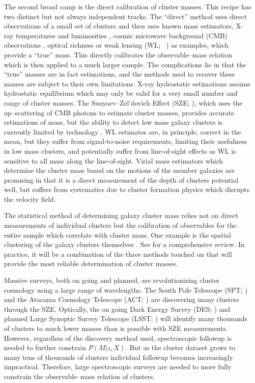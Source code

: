 \documentclass[fleqn,usenatbib]{mnras}
\begin{document}
The second broad camp is the direct calibration of cluster masses. This recipe has two distinct but not always independent tracks. The ``direct'' method uses direct observations of a small set of clusters and then uses known mass estimators, X-ray temperatures and luminosities , cosmic microwave background (CMB) observations , optical richness  or weak lensing (WL; \eg\ \citealt{Rozo2010}) as examples, which provide a ``true'' mass. This directly calibrates the observable--mass relation which is then applied to a much larger sample. The complications lie in that the ``true'' masses are in fact estimations, and the methods used to recover these masses are subject to their own limitations. X-ray hydrostatic estimations assume hydrostatic equilibrium  which may only be valid for a very small number and range of cluster masses. The Sunyaev--Zel'dovich Effect (SZE; \citealt{Sunyaev1972}), which uses the up--scattering of CMB photons to estimate cluster masses, provides accurate estimations of mass, but the ability to detect low mass galaxy clusters is currently limited by technology . WL estimates are, in principle, correct in the mean, but they suffer from signal-to-noise requirements, limiting their usefulness in low mass clusters, and potentially suffer from line-of-sight effects as WL is sensitive to all mass along the line-of-sight. Virial mass estimators which determine the cluster mass based on the motions of the member galaxies  are promising in that it is a direct measurement of the depth of clusters potential well, but suffers from systematics due to cluster formation physics which disrupts the velocity field.
 
The statistical method of determining galaxy cluster mass relies not on direct measurements of individual clusters but the calibration of observables for the entire sample which correlate with cluster mass. One example is the spatial clustering of the galaxy clusters themselves . See \cite{Weinberg2013} for a comprehensive review. In practice, it will be a combination of the three methods touched on that will provide the most reliable determination of cluster masses.

Massive surveys, both on going and planned, are revolutionizing cluster cosmology using a large range of wavelengths. The South Pole Telescope (SPT; \citealt{Carlstrom2011}) and the Atacama Cosmology Telescope (ACT; \citealt{Swetz2011}) are discovering many clusters through the SZE. Optically, the on going Dark Energy Survey (DES; \citealt{DES2005}) and planned Large Synoptic Survey Telescope (LSST; \citealt{LSST2012}) will identify many thousands of clusters to much lower masses than is possible with SZE measurements. However, regardless of the discovery method used, spectroscopic followup is needed to further constrain $P(M|z,X)$. But as the cluster dataset grows to many tens of thousands of clusters individual followup becomes increasingly impractical. Therefore, large spectroscopic surveys are needed to more fully constrain the observable--mass relation of clusters.
\end{document}
